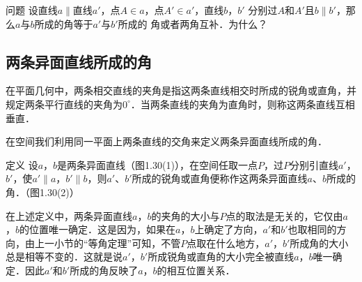 \begin{blk}{问题}
  设直线$a\parallel$直线$a'$，点$A\in a$，点$A'\in a'$，直线$b$，$b'$
分别过$A$和$A'$且$b\parallel b'$，那么$a$与$b$所成的角等于$a'$与$b'$所成的
角或者两角互补．为什么？
\end{blk}

\subsection{两条异面直线所成的角}
在平面几何中，两条相交直线的夹角是指这两条直线相交时所成的锐角或直角，并规定两条平行直线的夹角为$0^{\circ}$．当两条直线的夹角为直角时，则称这两条直线互相垂直．

在空间我们利用同一平面上两条直线的交角来定义两条异面直线所成的角．

\begin{blk}
  {定义} 设$a$，$b$是两条异面直线（图1.30(1)），在空间任取一点$P$，过$P$分别引直线$a'$，$b'$，使$a'\parallel a$，$b'\parallel b$，则$a'$、$b'$所成的锐角或直角便称作这两条异面直线$a$、$b$所成的角．（图1.30(2)）
\end{blk}

\begin{figure}[htp]
  \centering
  \caption{}
\end{figure}

在上述定义中，两条异面直线$a$，$b$的夹角的大小与$P$点的取法是无关的，它仅由$a$，$b$的位置唯一确定．这是因为，如果在$a$，$b$上确定了方向，$a'$和$b'$也取相同的方向，由上一小节的“等角定理”可知，不管$P$点取在什么地方，$a'$，$b'$所成角的大小总是相等不变的．这就是说$a'$，$b'$所成锐角或直角的大小完全被直线$a$，$b$唯一确定．因此$a'$和$b'$所成的角反映了$a$，$b$的相互位置关系．

